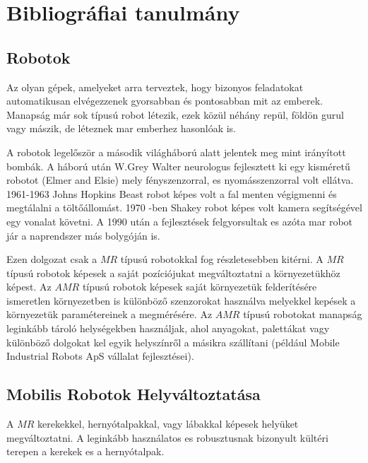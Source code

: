 \FloatBarrier 



\chapter{Bibliográfiai tanulmány} 



\section{Robotok} 

Az olyan gépek, amelyeket arra terveztek, hogy bizonyos feladatokat automatikusan elvégezzenek gyorsabban és pontosabban mit az emberek. Manapság már sok típusú robot létezik, ezek közül néhány repül, földön gurul vagy mászik, de léteznek mar emberhez hasonlóak is. 



A robotok legelőször a második világháború alatt jelentek meg mint irányított bombák. A háború után W.Grey Walter neurologus fejlesztett ki egy kisméretű robotot (Elmer and Elsie) mely fényszenzorral, es nyomásszenzorral volt ellátva. 1961-1963 Johns Hopkins Beast robot képes volt a fal menten végigmenni és megtálalni a töltőállomást. 1970 -ben Shakey robot képes volt kamera segítségével egy vonalat követni. A 1990 után a fejlesztések felgyorsultak es azóta mar robot jár a naprendszer más bolygóján is. 



Ezen dolgozat csak a $MR$ típusú robotokkal fog részletesebben kitérni. A $MR$ típusú robotok képesek a saját pozíciójukat megváltoztatni a környezetükhöz képest. Az $AMR$ típusú robotok képesek saját környezetük felderítésére ismeretlen környezetben is különböző szenzorokat használva melyekkel kepések a környezetük paramétereinek a megmérésére. Az $AMR$ típusú robotokat manapság leginkább tároló helységekben használjak, ahol anyagokat, palettákat vagy különböző dolgokat kel egyik helyszínről a másikra szállítani (például Mobile Industrial Robots ApS vállalat fejlesztései). 



\section{Mobilis Robotok Helyváltoztatása} 

A $MR$ kerekekkel, hernyótalpakkal, vagy lábakkal képesek helyüket megváltoztatni. A leginkább használatos es robusztusnak bizonyult kültéri terepen a kerekek es a hernyótalpak. 

